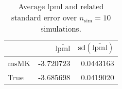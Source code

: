 \begin{table}[H]

\caption{Average lpml and related standard error over $n_{\text{sim}} = 10$ simulations.}
\centering
\begin{tabular}[t]{lrr}
\toprule
  & $\overbar{\text{lpml}}$ & $\text{sd}(\overbar{\text{lpml}})$\\
\midrule
msMK & -3.720723 & 0.0443163\\
True & -3.685698 & 0.0419020\\
\bottomrule
\end{tabular}
\end{table}